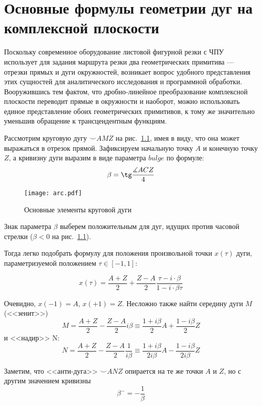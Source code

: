 
\chapter{%
  Основные формулы геометрии дуг на комплексной плоскости
}
\label{app:bulge}

Поскольку современное оборудование листовой фигурной резки с ЧПУ
использует для задания маршрута резки два геометрических примитива ---
отрезки прямых и дуги окружностей,
возникает вопрос удобного представления этих сущностей
для аналитического исследования и программной обработки.
Вооружившись тем фактом,
что дробно-линейное преобразование комплексной плоскости
переводит прямые в окружности и наоборот,
можно использовать единое представление обоих
геометрических примитивов,
к тому же значительно уменьшив обращение
к трансцендентным функциям.

Рассмотрим круговую дугу
${\smile}AMZ$
на рис.~\ref{fig:app.arc},
имея в виду,
что она может выражаться в отрезок прямой.
Зафиксируем начальную точку $A$
и конечную точку $Z$,
а кривизну дуги выразим в виде параметра
$bulge$
по формуле:
\begin{equation}
  \beta = \tg \frac{\measuredangle ACZ}{4}
\end{equation}

\begin{figure}
  \centering
  \texttt{[image: arc.pdf]}
  \caption{Основные элементы круговой дуги}
  \label{fig:app.arc}
\end{figure}

Знак параметра $\beta$
выберем положительным для дуг,
идущих против часовой стрелки
($\beta < 0$ на рис.~\ref{fig:app.arc}).

Тогда легко подобрать формулу для положения
произвольной точки
$x(\tau)$ дуги,
параметризуемой положением
$\tau \in[-1,1]$:

\begin{equation}
  x(\tau) =
  \frac{A+Z}{2} + \frac{Z-A}{2}\frac{\tau - i \cdot \beta}{1 - i \cdot \beta \tau}
\end{equation}

Очевидно,
$x(-1) = A$,
$x(+1) = Z$.
Несложно также найти середину дуги
$M$
(<<зенит>>)
$$
M = \frac{A+Z}{2} - \frac{Z-A}{2}i\beta
\equiv
\frac{1+i \beta}2 A + \frac{1-i \beta}2 Z
$$
и <<надир>> N:
$$
N = \frac{A+Z}{2} - \frac{Z-A}{2} \frac{1}{i\beta}
\equiv
\frac{1+i \beta}{2 i \beta} A - \frac{1 - i \beta}{2 i\beta} Z
$$

Заметим, что <<анти-дуга>>
${\smile} ANZ$
опирается на те же точки
$A$ и $Z$,
но с другим значением кривизны
$$
\beta^- = -\frac{1}{\beta}
$$

